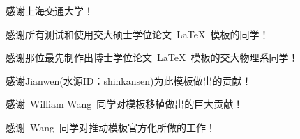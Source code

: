 
\begin{thanks}

  感谢上海交通大学！
  
  感谢所有测试和使用交大硕士学位论文~\LaTeX~模板的同学！

  感谢那位最先制作出博士学位论文~\LaTeX~模板的交大物理系同学！

  感谢Jianwen(水源ID：shinkansen)为此模板做出的贡献！

  感谢~William Wang~同学对模板移植做出的巨大贡献！

  感谢~Wang~同学对推动模板官方化所做的工作！


\end{thanks}

